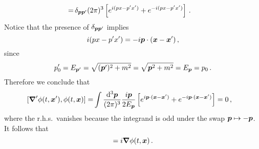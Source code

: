 \begin{sol}
\begin{equation}
\begin{split}
        = & \, \delta_{\boldsymbol{p} \boldsymbol{p}'} (2\pi)^3 \left[e^{i(p x - p'  x')} + e^{-i(p x - p'  x')}\right] \, .
    \end{split}
    \end{equation}
    Notice that the presence of $\delta_{\boldsymbol{p} \boldsymbol{p}'}$ implies 
    \begin{equation}
        i(p x - p'  x') = - i \boldsymbol{p} \cdot (\boldsymbol{x} - \boldsymbol{x}') \, ,
    \end{equation}
    since 
    \begin{equation}
        p_0' = E_{\boldsymbol{p}'} = \sqrt{(\boldsymbol{p}')^2 + m^2} = \sqrt{\boldsymbol{p}^2 + m^2} = E_{\boldsymbol{p}} = p_0 \, .
    \end{equation}
    Therefore we conclude that
    \begin{equation}
    \begin{split}
        [\boldsymbol{\nabla}' \phi(t,\boldsymbol{x}') , \phi(t,\boldsymbol{x})] = & \int \frac{{\rm d}^3\boldsymbol{p}}{(2\pi)^3} \frac{i \boldsymbol{p}}{2E_{\boldsymbol{p}}} \left[e^{i \boldsymbol{p} \cdot (\boldsymbol{x} - \boldsymbol{x}')} + e^{-i \boldsymbol{p} \cdot (\boldsymbol{x} - \boldsymbol{x}')}\right] = 0 \, ,
    \end{split}
    \end{equation}
    where the r.h.s.~vanishes because the integrand is odd under the swap $\boldsymbol{p} \mapsto - \boldsymbol{p}$. It follows that
    \begin{equation}
        [\vP, \phi(t,\vx)] = i \vgrad \phi(t,\vx) \, .
    \end{equation}
\end{sol}